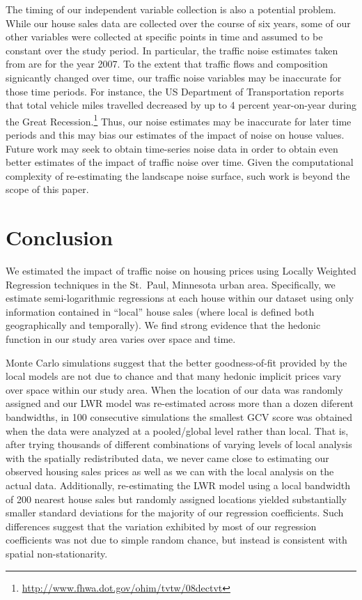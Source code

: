 \documentclass{article}\usepackage{graphicx, color}
\begin{document}
The timing of our independent variable collection is also a potential problem. While our house sales data are collected over the course of six years, some of our other variables were collected at specific points in time and assumed to be constant over the study period. In particular, the traffic noise estimates taken from \citet{Nega2012} are for the year 2007. To the extent that traffic flows and composition signicantly changed over time, our traffic noise variables may be inaccurate for those time periods. For instance, the US Department of Transportation reports that total vehicle miles travelled decreased by up to 4 percent year-on-year during the Great Recession.\footnote{\url{http://www.fhwa.dot.gov/ohim/tvtw/08dectvt}} Thus, our noise estimates may be inaccurate for later time periods and this may bias our estimates of the impact of noise on house values. Future work may seek to obtain time-series noise data in order to obtain even better estimates of the impact of traffic noise over time. Given the computational complexity of re-estimating the landscape noise surface, such work is beyond the scope of this paper.

\section{Conclusion}

We estimated the impact of traffic noise on housing prices using Locally Weighted Regression techniques in the St.\ Paul, Minnesota urban area. Specifically, we estimate semi-logarithmic regressions at each house within our dataset using only information contained in ``local'' house sales (where local is defined both geographically and temporally). We find strong evidence that the hedonic function in our study area varies over space and time. 

Monte Carlo simulations suggest that the better goodness-of-fit provided by the local models are not due to chance and that many hedonic implicit prices vary over space within our study area. When the location of our data was randomly assigned and our LWR model was re-estimated across more than a dozen diferent bandwidths, in 100 consecutive simulations the smallest GCV score was obtained when the data were analyzed at a pooled/global level rather than local. That is, after trying thousands of different combinations of varying levels of local analysis with the spatially redistributed data, we never came close to estimating our observed housing sales prices as well as we can with the local analysis on the actual data. Additionally, re-estimating the LWR model using a local bandwidth of 200 nearest house sales but randomly assigned locations yielded substantially smaller standard deviations for the majority of our regression coefficients. Such differences suggest that the variation exhibited by most of our regression coefficients was not due to simple random chance, but instead is consistent with spatial non-stationarity. 
\end{document}
